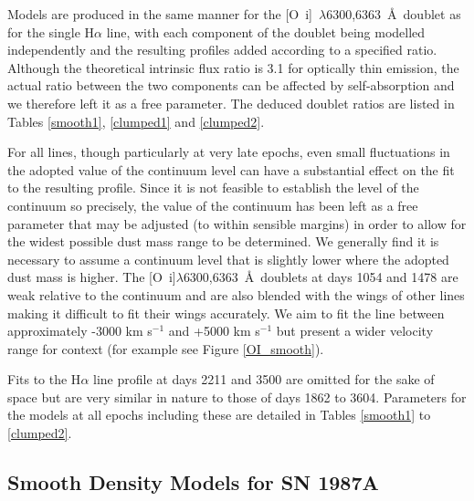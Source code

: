 \documentclass[useAMS,usenatbib,usegraphicx]{mnras}
\begin{document}
Models are produced in the same manner for the 
[O~{\sc i}]~$\lambda$6300,6363~\AA\ doublet as for the single H$\alpha$ line, with each component 
of the doublet being modelled independently and the resulting profiles 
added according to a specified ratio.  Although the theoretical intrinsic flux ratio 
is 3.1 for optically thin emission, the actual ratio between the two components can be 
affected by self-absorption \citep{Li1992} and we therefore 
left it as a free parameter.  The deduced doublet ratios are listed in Tables \ref{smooth1}, \ref{clumped1} and \ref{clumped2}.  

For all lines, though particularly at very late epochs, even small fluctuations in the adopted value of the 
continuum level can have a substantial effect on the fit to the resulting 
profile.  Since it is not feasible to establish the level of the continuum 
so precisely, the value of the continuum has been left as a free parameter 
that may be adjusted (to within sensible margins) in order to allow for 
the widest possible dust mass range to be determined.  We generally find 
it is necessary to assume a continuum level that is slightly lower where 
the adopted dust mass is higher.  The [O~{\sc i}]$\lambda$6300,6363~\AA\ doublets at days 1054 and 1478 are weak relative to the continuum and are also blended with the wings of other lines making it difficult to fit their wings accurately.  We aim to fit the line between approximately -3000 km s$^{-1}$ and +5000 km s$^{-1}$ but present a wider velocity range for context (for example see Figure \ref{OI_smooth}).

Fits to the H$\alpha$ line profile at days 2211 and 3500 are omitted for the sake of space but are very similar in nature to those of days 1862 to 3604.  Parameters for the models at all epochs including these are detailed in Tables \ref{smooth1} to \ref{clumped2}.


\subsection{Smooth Density Models for SN 1987A}
\label{smooth_models}
\end{document}
